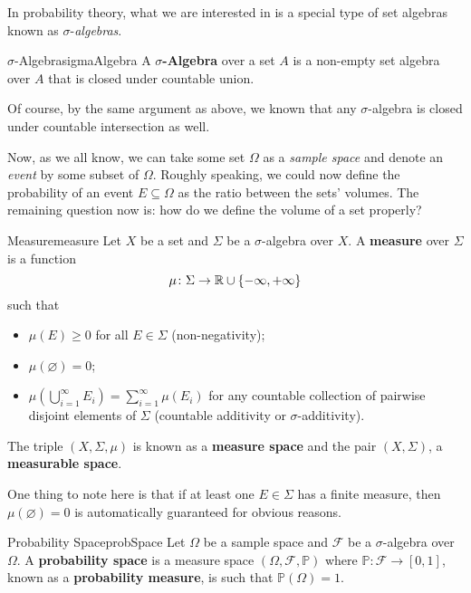 \documentclass[math]{amznotes}
\theoremstyle{remark}
\begin{document}
In probability theory, what we are interested in is a special type of set algebras known as $\sigma$-\textit{algebras}.
\begin{dfnbox}{$\sigma$-Algebra}{sigmaAlgebra}
    A {\color{red} \textbf{$\sigma$-Algebra}} over a set $A$ is a non-empty set algebra over $A$ that is closed under countable union.
\end{dfnbox}
Of course, by the same argument as above, we known that any $\sigma$-algebra is closed under countable intersection as well.

Now, as we all know, we can take some set $\Omega$ as a \textit{sample space} and denote an \textit{event} by some subset of $\Omega$. Roughly speaking, we could now define the probability of an event $E \subseteq \Omega$ as the ratio between the sets' volumes. The remaining question now is: how do we define the volume of a set properly?
\begin{dfnbox}{Measure}{measure}
    Let $X$ be a set and $\Sigma$ be a $\sigma$-algebra over $X$. A {\color{red} \textbf{measure}} over $\Sigma$ is a function 
    \begin{equation*}
        \mu \colon \Sigma \to \mathbb{R} \cup \{-\infty, +\infty\}
    \end{equation*}
    such that 
    \begin{itemize}
        \item $\mu\left(E\right) \geq 0$ for all $E \in \Sigma$ (non-negativity);
        \item $\mu\left(\varnothing\right) = 0$;
        \item $\mu\left(\bigcup_{i = 1}^{\infty}E_i\right) = \sum_{i = 1}^{\infty}\mu\left(E_i\right)$ for any countable collection of pairwise disjoint elements of $\Sigma$ (countable additivity or $\sigma$-additivity).
    \end{itemize}
    The triple $\left(X, \Sigma, \mu\right)$ is known as a {\color{red} \textbf{measure space}} and the pair $\left(X, \Sigma\right)$, a {\color{red} \textbf{measurable space}}.
\end{dfnbox}
One thing to note here is that if at least one $E \in \Sigma$ has a finite measure, then $\mu\left(\varnothing\right) = 0$ is automatically guaranteed for obvious reasons.
\begin{dfnbox}{Probability Space}{probSpace}
    Let $\Omega$ be a sample space and $\mathcal{F}$ be a $\sigma$-algebra over $\Omega$. A {\color{red} \textbf{probability space}} is a measure space $\left(\Omega, \mathcal{F}, \mathbb{P}\right)$ where $\mathbb{P} \colon \mathcal{F} \to [0, 1]$, known as a {\color{red} \textbf{probability measure}}, is such that $\mathbb{P}\left(\Omega\right) = 1$.
\end{dfnbox}
\end{document}

